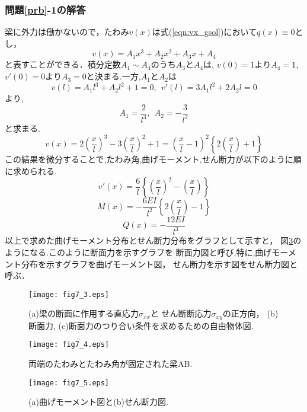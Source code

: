 \documentclass[10pt,a4j]{jarticle}
\begin{document}
\subsubsection*{問題\ref{prb}-1の解答}
梁に外力は働かないので，たわみ$v(x)$は式(\ref{eqn:vx_gsol})において$q(x)\equiv 0$とし，
\begin{equation}
	v(x)=A_1 x^3 +A_2x^2 + A_3x + A_4
\end{equation}
と表すことができる．積分定数$A_1\sim A_4$のうち$A_3$と$A_4$は, $v(0)=1$より$A_4=1$,
$v'(0)=0$より$A_3=0$と決まる.一方,$A_1$と$A_2$は
\[
	v(l)=A_1l^3+A_2l^2+1=0, \ \ 
	v'(l)=3A_1l^2+2A_2l=0
\]
より, 
\[
	A_1=\frac{2}{l^3}, \ \ A_2=-\frac{3}{l^2}
\]
と求まる.
\[
	v(x)=
	2\left(\frac{x}{l}\right)^3
	-
	3\left(\frac{x}{l}\right)^2
	+
	1
	=\left(\frac{x}{l}-1\right)^2\left\{ 2\left(\frac{x}{l}\right)+1\right\}
\]
この結果を微分することで,たわみ角,曲げモーメント,せん断力が以下のように順に求められる.
\[
	v'(x)=\frac{6}{l}\left\{ \left(\frac{x}{l}\right)^2-\left(\frac{x}{l} \right) \right\}
\]
\[
	M(x)=-\frac{6EI}{l^2}\left\{ 2\left(\frac{x}{l}\right)-1 \right\}
\]
\[
	Q(x)=-\frac{12EI}{l^3}
\]
以上で求めた曲げモーメント分布とせん断力分布をグラフとして示すと，
図\ref{fig:fig7_5}のようになる.このように断面力を示すグラフを
断面力図と呼び,特に,曲げモーメント分布を示すグラフを曲げモーメント図，
せん断力を示す図をせん断力図と呼ぶ．
\begin{figure}
	\begin{center}
	\texttt{[image: fig7\_3.eps]} 
	\end{center}
	\caption{
	(a)梁の断面に作用する直応力$\sigma_{xx}$と
	せん断断応力$\sigma_{xy}$の正方向，
	(b)断面力, 
	(c)断面力のつり合い条件を求めるための自由物体図. 
	 } 
	\label{fig:fig7_3}
\end{figure}
\begin{figure}
	\begin{center}
	\texttt{[image: fig7\_4.eps]} 
	\end{center}
	\caption{両端のたわみとたわみ角が固定された梁AB.} 
	\label{fig:fig7_4}
\end{figure}
\begin{figure}
	\begin{center}
	\texttt{[image: fig7\_5.eps]} 
	\end{center}
	\caption{(a)曲げモーメント図と(b)せん断力図.} 
	\label{fig:fig7_5}
\end{figure}
\end{document}
